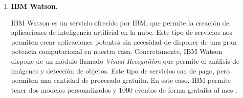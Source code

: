 \begin{enumerate}
	\item \textbf{IBM Watson}.
	
	IBM Watson es un servicio ofrecido por IBM, que permite la creación de aplicaciones de inteligencia artificial en la nube. Este tipo de servicios nos permiten crear aplicaciones potentes sin necesidad de disponer de una gran potencia computacional en nuestra casa. Concretamente, IBM Watson dispone de un módulo llamado \textit{Visual Recognition} que permite el análisis de imágenes y detección de objetos. Este tipo de servicios son de pago, pero permiten una cantidad de procesado gratuita. En este caso, IBM permite tener dos modelos personalizados y 1000 eventos de forma gratuita al mes \cite{ibm}. 
\end{enumerate}



